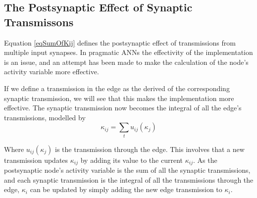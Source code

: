 		

		\subsection{The Postsynaptic Effect of Synaptic Transmissons}
			\label{ssecSynInputToANodeKANN}
			Equation \eqref{eqSumOfKij} defines the postsynaptic effect of transmissions from multiple input synapses.
			In pragmatic ANNs the effectivity of the implementation is an issue, and an attempt has been made to make the calculation of the node's activity variable more effective.
			
			If we define a transmission in the edge as the derived of the corresponding synaptic transmission, we will see that this makes the implementation more effective.
			The synaptic transmission now becomes the integral of all the edge's transmissions, modelled by %
			\begin{equation}
				\kappa_{ij} = \sum_t{u_{ij}(\kappa_j)}
				\label{eqSynapticTransmissionAsSumOfEdgeTransmissions}
			\end{equation}
			
			Where $u_{ij}(\kappa_j)$ is the transmission through the edge.
			This involves that a new transmission updates $\kappa_{ij}$ by adding its value to the current $\kappa_{ij}$.
			As the postsynaptic node's activity variable is the sum of all the synaptic transmissions, and each synaptic transmission is the integral of all the transmissions through the edge, 
				$\kappa_i$ can be updated by simply adding the new edge transmission to $\kappa_i$.

